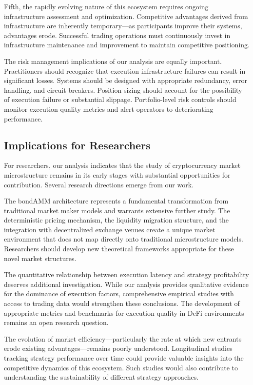 \documentclass[12pt,a4paper]{article}
\begin{document}
Fifth, the rapidly evolving nature of this ecosystem requires ongoing infrastructure assessment and optimization. Competitive advantages derived from infrastructure are inherently temporary—as participants improve their systems, advantages erode. Successful trading operations must continuously invest in infrastructure maintenance and improvement to maintain competitive positioning.

The risk management implications of our analysis are equally important. Practitioners should recognize that execution infrastructure failures can result in significant losses. Systems should be designed with appropriate redundancy, error handling, and circuit breakers. Position sizing should account for the possibility of execution failure or substantial slippage. Portfolio-level risk controls should monitor execution quality metrics and alert operators to deteriorating performance.

\subsection{Implications for Researchers}

For researchers, our analysis indicates that the study of cryptocurrency market microstructure remains in its early stages with substantial opportunities for contribution. Several research directions emerge from our work.

The bondAMM architecture represents a fundamental transformation from traditional market maker models and warrants extensive further study. The deterministic pricing mechanism, the liquidity migration structure, and the integration with decentralized exchange venues create a unique market environment that does not map directly onto traditional microstructure models. Researchers should develop new theoretical frameworks appropriate for these novel market structures.

The quantitative relationship between execution latency and strategy profitability deserves additional investigation. While our analysis provides qualitative evidence for the dominance of execution factors, comprehensive empirical studies with access to trading data would strengthen these conclusions. The development of appropriate metrics and benchmarks for execution quality in DeFi environments remains an open research question.

The evolution of market efficiency—particularly the rate at which new entrants erode existing advantages—remains poorly understood. Longitudinal studies tracking strategy performance over time could provide valuable insights into the competitive dynamics of this ecosystem. Such studies would also contribute to understanding the sustainability of different strategy approaches.
\end{document}
